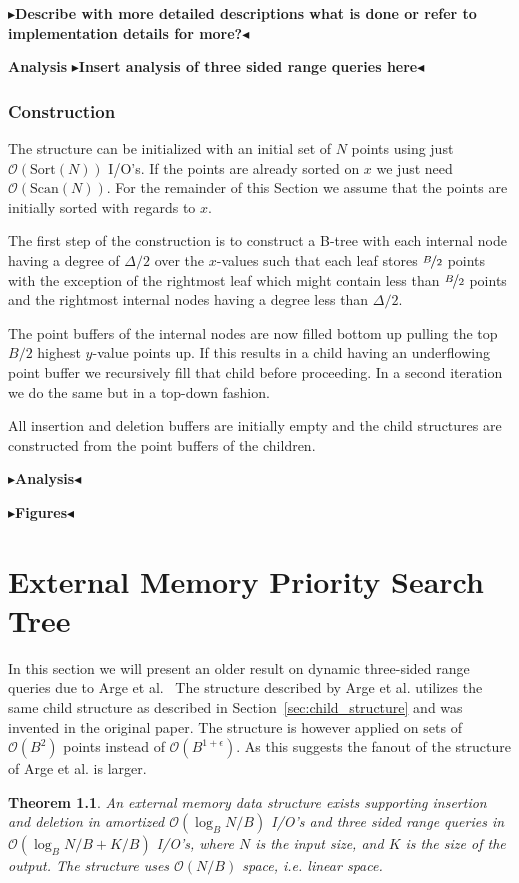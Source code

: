 \documentclass[twoside,11pt,openright]{report}
\newtheorem{theorem}{Theorem}
\newcommand{\todo}[1]{{\color[rgb]{.5,0,0}\textbf{$\blacktriangleright$#1$\blacktriangleleft$}}}
\begin{document}
\todo{Describe with more detailed descriptions what is done or refer to implementation details for more?}

\textbf{Analysis}
\todo{Insert analysis of three sided range queries here}

\subsection{Construction}
The structure can be initialized with an initial set of $N$ points using just $\mathcal{O}(\text{Sort}(N))$ I/O's. If the points are already sorted on $x$ we just need $\mathcal{O}(\text{Scan}(N))$. For the remainder of this Section we assume that the points are initially sorted with regards to $x$.

The first step of the construction is to construct a B-tree with each internal node having a degree of $\Delta/2$ over the $x$-values such that each leaf stores $\nicefrac{B}{2}$ points with the exception of the rightmost leaf which might contain less than $\nicefrac{B}{2}$ points and the rightmost internal nodes having a degree less than $\Delta/2$.

The point buffers of the internal nodes are now filled bottom up pulling the top $B/2$ highest $y$-value points up. If this results in a child having an underflowing point buffer we recursively fill that child before proceeding. In a second iteration we do the same but in a top-down fashion.

All insertion and deletion buffers are initially empty and the child structures are constructed from the point buffers of the children.

\todo{Analysis}

\todo{Figures}


\chapter{External Memory Priority Search Tree}
In this section we will present an older result on dynamic three-sided range queries due to Arge et al.~\cite{arge_samoladas_vitter_1999}
The structure described by Arge et al. utilizes the same child structure as described in Section~\ref{sec:child_structure} and was invented in the original paper. The structure is however applied on sets of $\mathcal{O}(B^2)$ points instead of $\mathcal{O}(B^{1+\epsilon})$. As this suggests the fanout of the structure of Arge et al. is larger.

\begin{theorem}
An external memory data structure exists supporting insertion and deletion in amortized $\mathcal{O}(\log_B N/B)$ I/O's and three sided range queries in $\mathcal{O}(\log_B N/B + K/B)$ I/O's, where $N$ is the input size, and $K$ is the size of the output. The structure uses $\mathcal{O}(N/B)$ space, i.e. linear space.
\end{theorem}
\end{document}
